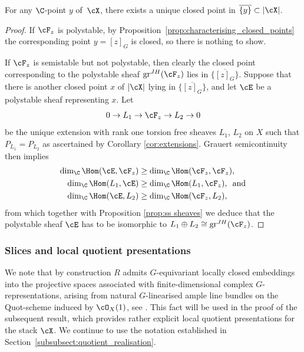 \begin{Prop}
For any $\C$-point $y$ of~$\cX$, there exists a unique closed point in $\overline{\{y\}} \subset |\cX|$.
\end{Prop}
\begin{proof}
If $\cF_z$ is polystable, by Proposition~\ref{prop:characterising_closed_points} the corresponding point $y = [z]_G$ is closed, so there is nothing to show.

If $\cF_z$ is semistable but not polystable, then clearly the closed point corresponding to the polystable sheaf $\mathrm{gr}^{JH}(\cF_z)$ lies in $\overline{\{[z]_G\}}$.
Suppose that there is another closed point $x$ of $|\cX|$ lying in $\overline{\{[z]_G\}}$, and let $\cE$ be a polystable sheaf representing $x$. Let
\[0\to L_1\to \cF_z \to L_2\to 0\]
be the unique extension
with rank one torsion free sheaves $L_1$, $L_2$ on $X$ such that $P_{L_1}=P_{L_2}$ as ascertained by Corollary
\ref{cor:extensions}.
Grauert semicontinuity then implies
\begin{align*}
\dim_\C \Hom(\cE,\cF_z) &\geq \dim_\C\Hom(\cF_z, \cF_z),\\
\dim_\C \Hom(L_1, \cE) &\geq \dim_\C\Hom(L_1, \cF_z), \, \text{ and}\\
\dim_\C \Hom(\cE,L_2) &\geq \dim_\C\Hom(\cF_z, L_2),
\end{align*}
from which together with Proposition \ref{prop:ss sheaves} we deduce that the polystable sheaf $\cE$ has to be isomorphic to $ L_1 \oplus L_2 \cong \mathrm{gr}^{JH}(\cF_z)$.
\end{proof}

\subsubsection{Slices and local quotient presentations}
We note that by construction $R$ admits $G$-equivariant locally closed embeddings into the projective spaces associated with finite-dimensional complex $G$-representations, arising from natural $G$-linearised ample line bundles on the Quot-scheme induced by $\cO_X(1)$, see \cite[p.~101]{HL}. This fact will be used in the proof of the subsequent result, which provides rather explicit local quotient presentations for the stack $\cX$. We continue to use the notation established in Section~\ref{subsubsect:quotient_realisation}.

